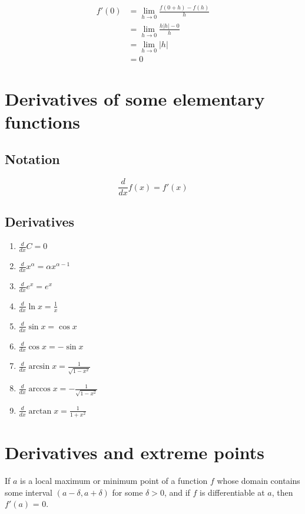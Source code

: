 \documentclass[11pt]{article}
\begin{document}
\begin{align*}
f'(0) &= \lim_{h \rightarrow 0} \frac{f(0 + h) - f(h)}{h} \\
&= \lim_{h \rightarrow 0} \frac{h|h| - 0}{h} \\
&= \lim_{h \rightarrow 0} |h| \\
&= 0
\end{align*}

\newpage

\section{Derivatives of some elementary functions}
\label{sec:orge81ff79}

\subsection{Notation}
\label{sec:org5c15536}
\[\frac{d}{dx} f(x) = f'(x)\]

\subsection{Derivatives}
\label{sec:org8eb3585}
\begin{enumerate}
\item \(\frac{d}{dx} C = 0\)
\item \(\frac{d}{dx} x^{\alpha} = \alpha x^{\alpha - 1}\)
\item \(\frac{d}{dx} e^x = e^x\)
\item \(\frac{d}{dx} \ln x = \frac{1}{x}\)
\item \(\frac{d}{dx} \sin x = \cos x\)
\item \(\frac{d}{dx} \cos x = - \sin x\)
\item \(\frac{d}{dx} \arcsin x = \frac{1}{\sqrt{1 - x^2}}\)
\item \(\frac{d}{dx} \arccos x = - \frac{1}{\sqrt{1 - x^2}}\)
\item \(\frac{d}{dx} \arctan x = \frac{1}{1 + x^2}\)
\end{enumerate}

\newpage

\section{Derivatives and extreme points}
\label{sec:org9f2d06c}
If \(a\) is a local maximum or minimum point of a function \(f\) whose domain contains some interval \((a - \delta, a + \delta)\) for some \(\delta > 0\), and if \(f\) is differentiable at \(a\), then \(f'(a)\) = 0.
\end{document}

